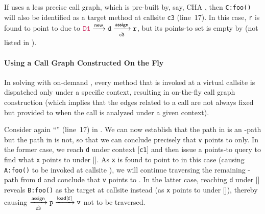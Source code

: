 
If \manuLFC uses a less precise 
 call graph, which is pre-built by, say,  CHA \cite{dean1995optimization}, then
 \texttt{C:foo()} will also be identified as a target method at callsite {\texttt{c3}} (line~17). In this case, \texttt{r} is found to point to 
 due to ${\color{purple} \texttt{D1}}\xrightarrow{\textsf{new}}\texttt{d}\xrightarrow[\hat{\mathtt{c3}}]{\textsf{assign}}
\texttt{r}$, but
its points-to set is empty by  (not  listed in ).
 
\begin{comment}
\begin{equation} \scriptsize
  \centering
\label{eq:LFCPathCGImprecise}
\begin{tabular}{l}
\commentfont{D}$\xrightarrow{\new}
\texttt{d}\xrightarrow[\hat{\mathtt{c3}}]{\assign}
\texttt{r}
$
\end{tabular}
\end{equation}
\end{comment}

 


\paragraph{\bf Using a Call Graph Constructed On the Fly}
\label{sec:LFC+fly}
In solving  with \manuLFC on-demand \cite{sridharan2006refinement,yan2011demand,shang2012demand},
every method that is invoked at a virtual callsite is dispatched  only 
under a specific context, resulting in on-the-fly call graph construction (which
implies that the \pag edges related to a call are not always
fixed but provided to \manuLFC when the call is analyzed under a given context). 

Consider again ``'' (line~17) in .
We can now establish that the path in
 is an \manuLFC-path but the   
path  in  is not, so that
we can conclude precisely that \texttt{v} points to  only.
In the former case, we reach \texttt{d} under context [\texttt{c1}] 
and then issue a points-to query to find what
\texttt{x}  points to  under []. As \texttt{x} is found to point to  in this case
(causing
\texttt{A:foo()} to be invoked at callsite ), we will continue traversing the
remaining \manuLFC-path from \texttt{d}
and conclude that \texttt{v} points to . In the latter case,
reaching
\texttt{d} under  [] reveals \texttt{B:foo()} as the target at callsite
 instead
(as \texttt{x} points to  under []), thereby causing 
$\xrightarrow[\hat{{\mathtt{c3}}}]{\textsf{assign}} \mathtt{p} \xrightarrow{\textsf{load}[\texttt{f}]} \mathtt{v}$
not 
 to be traversed.

